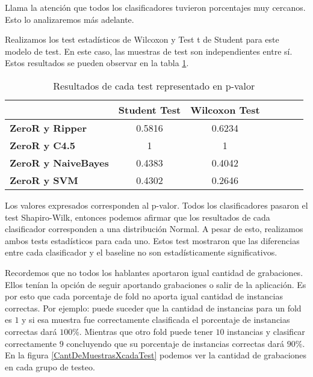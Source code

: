Llama la atención que todos los clasificadores tuvieron porcentajes muy cercanos. Esto lo analizaremos más adelante. 

Realizamos los test estadísticos de Wilcoxon y Test t de Student para este modelo de test. En este caso, las muestras de test son independientes entre sí. Estos resultados se pueden observar en la tabla  \ref{HPTDT_res_tests_wilcoxon_student}.

\begin{table}[H]
	\centering
	\begin{tabular}{|l|c|c|c|c|c|c|}
		\hline
		\textbf{}  & \textbf{Student Test} & \textbf{Wilcoxon Test} \\ \hline
		\textbf{ZeroR y Ripper}  & 0.5816 & 0.6234 \\ \hline
		\textbf{ZeroR y C4.5}  & 1 & 1 \\ \hline
		\textbf{ZeroR y NaiveBayes}  & 0.4383 & 0.4042 \\ \hline
		\textbf{ZeroR y SVM}  & 0.4302 & 0.2646 \\ \hline
	\end{tabular}
	\caption{Resultados de cada test representado en p-valor}
	\label{HPTDT_res_tests_wilcoxon_student}
\end{table}

Los valores expresados corresponden al p-valor. Todos los clasificadores pasaron el test Shapiro-Wilk, entonces podemos afirmar que los resultados de cada clasificador corresponden a una distribución Normal. A pesar de esto, realizamos ambos tests estadísticos para cada uno. Estos test mostraron que las diferencias entre cada clasificador y el baseline no son estadísticamente significativos.

Recordemos que no todos los hablantes aportaron igual cantidad de grabaciones. Ellos tenían la opción de seguir aportando grabaciones o salir de la aplicación. Es por esto que cada porcentaje de fold no aporta igual cantidad de instancias correctas. Por ejemplo: puede suceder que la cantidad de instancias para un fold es $1$ y si esa muestra fue correctamente clasificada el porcentaje de instancias correctas dará $100\%$. Mientras que otro fold puede tener $10$ instancias y clasificar correctamente $9$ concluyendo que su porcentaje de instancias correctas dará $90\%$. En la figura \ref{CantDeMuestrasXcadaTest} podemos ver la cantidad de grabaciones en cada grupo de testeo. 

